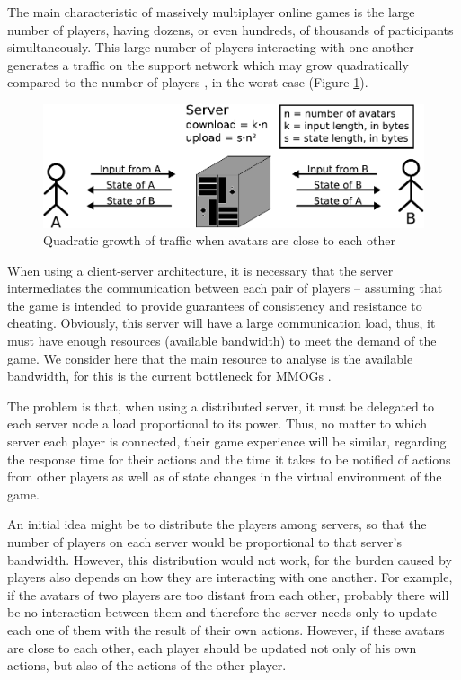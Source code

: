 The main characteristic of massively multiplayer online games is the large number of players, having dozens, or even hundreds, of thousands of participants simultaneously. This large number of players interacting with one another generates a traffic on the support network which may grow quadratically compared to the number of players \cite{chen2006gta}, in the worst case (Figure \ref{fig:quadratic}).

\begin{figure}
  \centering
  \includegraphics[width=0.6\linewidth]{images/quadratic}
  \caption{Quadratic growth of traffic when avatars are close to each other}
  \label{fig:quadratic}
\end{figure}

When using a client-server architecture, it is necessary that the server intermediates the communication between each pair of players -- assuming that the game is intended to provide guarantees of consistency and resistance to cheating. Obviously, this server will have a large communication load, thus, it must have enough resources (available bandwidth) to meet the demand of the game. We consider here that the main resource to analyse is the available bandwidth, for this is the current bottleneck for MMOGs \cite{feng2007wnn}.

The problem is that, when using a distributed server, it must be delegated to each server node a load proportional to its power. Thus, no matter to which server each player is connected, their game experience will be similar, regarding the response time for their actions and the time it takes to be notified of actions from other players as well as of state changes in the virtual environment of the game.
	
An initial idea might be to distribute the players among servers, so that the number of players on each server would be proportional to that server's bandwidth. However, this distribution would not work, for the burden caused by players also depends on how they are interacting with one another. For example, if the avatars of two players are too distant from each other, probably there will be no interaction between them and therefore the server needs only to update each one of them with the result of their own actions. However, if these avatars are close to each other, each player should be updated not only of his own actions, but also of the actions of the other player.
	
